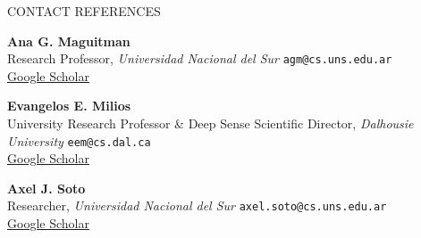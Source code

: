 \documentclass{resume} %
\begin{document}
\begin{rSection}{CONTACT REFERENCES}
\vspace{-0.2cm}

\setlength{\itemsep}{0.32em}

% 
\item \textbf{Ana G. Maguitman}\\
Research Professor, \textit{Universidad Nacional del Sur} \hfill \texttt{agm@cs.uns.edu.ar} \\
\href{https://scholar.google.com.ar/citations?user=upxByNEAAAAJ&hl=en&oi=ao}{Google Scholar}

\item \textbf{Evangelos E. Milios}\\
University Research Professor \& Deep Sense Scientific Director, \textit{Dalhousie University} \hfill \texttt{eem@cs.dal.ca}\\
\href{https://scholar.google.com.ar/citations?user=ME8aQywAAAAJ&hl=en&oi=ao}{Google Scholar}

\item \textbf{Axel J. Soto}\\
Researcher, \textit{Universidad Nacional del Sur} \hfill \texttt{axel.soto@cs.uns.edu.ar}\\
\href{https://scholar.google.com.ar/citations?user=AlwbL8IAAAAJ&hl=en&oi=ao}{Google Scholar}
\end{rSection}



\end{document}
